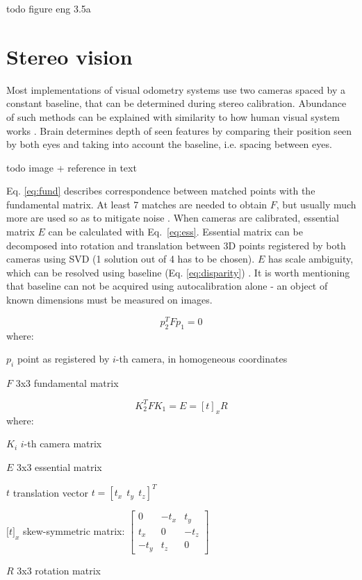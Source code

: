 todo figure eng 3.5a


\section{Stereo vision}
\label{sec:stereo}

Most implementations of visual odometry systems use two cameras spaced by a constant baseline, that can be determined during stereo calibration. Abundance of such methods can be explained with similarity to how human visual system works \cite{cyganek}. Brain determines depth of seen features by comparing their position seen by both eyes and taking into account the baseline, i.e. spacing between eyes.

todo image + reference in text

Eq. \ref{eq:fund} describes correspondence between matched points with the fundamental matrix. At least 7 matches are needed to obtain $F$, but usually much more are used so as to mitigate noise \cite{determining_the_epipolar}. When cameras are calibrated, essential matrix $E$ can be calculated with Eq.~\ref{eq:ess}. Essential matrix can be decomposed into rotation and translation between 3D points registered by both cameras using SVD (1 solution out of 4 has to be chosen). $E$ has scale ambiguity, which can be resolved using baseline (Eq. \ref{eq:disparity}) \cite{improving}. It is worth mentioning that baseline can not be acquired using autocalibration alone - an object of known dimensions must be measured on images.

\begin{equation}
p_{2}^{T}Fp_{1}=0
\label{eq:fund}
\end{equation}
where:
\begin{eqwhere}[2cm]
	\item[$p_{i}$] point as registered by $i$-th camera, in homogeneous coordinates
	\item[$F$] 3x3 fundamental matrix
\end{eqwhere}

\begin{equation}
K_{2}^{T}FK_{1}=E=[t]_{x}R
\label{eq:ess}
\end{equation}
where:
\begin{eqwhere}[2cm]
	\item[$K_{i}$] $i$-th camera matrix
	\item[$E$] 3x3 essential matrix
	\item[$t$] translation vector $t=[t_{x}\ \ t_{y}\ \ t_{z}]^T$
	\item[$\lbrack t \rbrack _{x}$] skew-symmetric matrix: $\begin{bmatrix}
		0 & -t_{x} & t_{y} \\ 
		t_{x} & 0 & -t_{z} \\ 
		-t_{y} & t_{z} & 0
	\end{bmatrix}$
	\item[$R$] 3x3 rotation matrix
\end{eqwhere}

